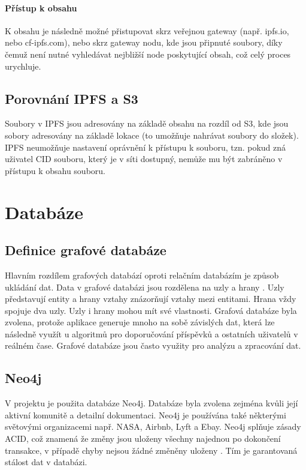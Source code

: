 \documentclass[12pt, a4paper,
 twoside,        %
 openright
]{report}
\begin{document}
            \paragraph{Přístup k obsahu} K obsahu je následně možné přistupovat skrz veřejnou gateway (např. ipfs.io, nebo cf-ipfs.com), nebo skrz gateway nodu, kde jsou připnuté soubory, díky čemuž není nutné vyhledávat nejbližší node poskytující obsah, což celý proces urychluje. \cite{IPFSgateways}
        \subsection{Porovnání IPFS a S3}
            Soubory v IPFS jsou adresovány na základě obsahu na rozdíl od S3, kde jsou sobory adresovány na základě lokace (to umožňuje nahrávat soubory do složek). IPFS neumožňuje nastavení oprávnění k přístupu k souboru, tzn. pokud zná uživatel CID souboru, který je v síti dostupný, nemůže mu být zabráněno v přístupu k obsahu souboru.

    \section{Databáze}
    \subsection{Definice grafové databáze}
        Hlavním rozdílem grafových databází oproti relačním databázím je způsob ukládání dat. 
        Data v grafové databázi jsou rozdělena na uzly a hrany \cite{graphenTheorie}. Uzly představují entity a hrany vztahy znázorňují vztahy mezi entitami. Hrana vždy spojuje dva uzly.
        Uzly i hrany mohou mít své vlastnosti. Grafová databáze byla zvolena, protože aplikace generuje mnoho na sobě závislých dat, která
        lze následně využít u algoritmů pro doporučování příspěvků a ostatních uživatelů v reálném čase. Grafové databáze jsou často využity pro analýzu a zpracování dat. \cite{graphDatabasesIntroduction}\cite{graphAlgorithms}
    \subsection{Neo4j}
        V projektu je použita databáze Neo4j. Databáze byla zvolena zejména kvůli její aktivní komunitě a detailní dokumentaci. Neo4j je používána také některými světovými organizacemi např. NASA, Airbnb, Lyft a Ebay. Neo4j splňuje zásady ACID, což znamená že změny jsou uloženy všechny najednou po dokončení transakce, v případě chyby nejsou žádné změněny uloženy \cite{ACIDRules}. Tím je garantovaná stálost dat v databázi. \cite{aboutNeo4j}
\end{document}
